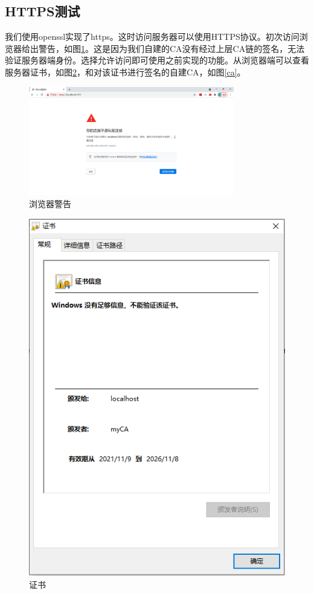 \documentclass[a4paper]{article}
\begin{document}
\subsection{HTTPS测试}

我们使用openssl实现了https。这时访问服务器可以使用HTTPS协议。初次访问浏览器给出警告，如图\ref{warning}。这是因为我们自建的CA没有经过上层CA链的签名，无法验证服务器端身份。选择允许访问即可使用之前实现的功能。从浏览器端可以查看服务器证书，如图\ref{certificate}，和对该证书进行签名的自建CA，如图\ref{ca}。
\begin{figure}
\begin{center}
\includegraphics[width=0.8\textwidth]{figs/warning.PNG}
\end{center}
\caption{浏览器警告}
\label{warning}
\end{figure}

\begin{figure}
\begin{center}
\includegraphics[scale=0.6]{figs/certificate.PNG}
\end{center}
\caption{证书}
\label{certificate}
\end{figure}
\end{document}
